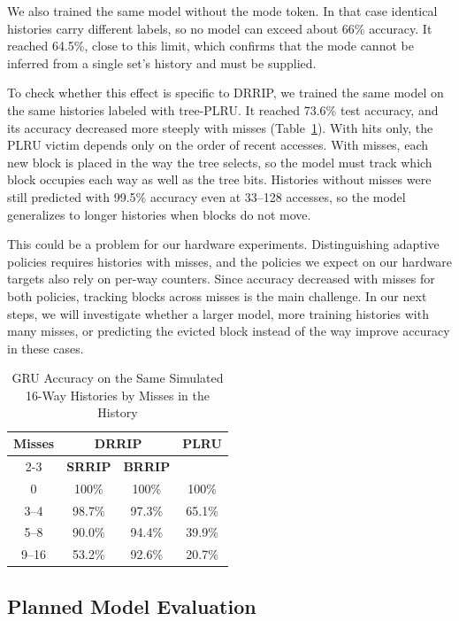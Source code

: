 We also trained the same model without the mode token. In
that case identical histories carry different labels, so
no model can exceed about 66\% accuracy. It reached
64.5\%, close to this limit, which confirms that the mode
cannot be inferred from a single set's history and must
be supplied.

To check whether this effect is specific to DRRIP, we
trained the same model on the same histories labeled with
tree-PLRU. It reached 73.6\% test accuracy, and its accuracy
decreased more steeply with misses
(Table~\ref{tab:drrip_results}). With hits only, the PLRU
victim depends only on the order of recent accesses. With
misses, each new block is placed in the way the tree
selects, so the model must track which block occupies each
way as well as the tree bits. Histories without misses were
still predicted with 99.5\% accuracy even at 33--128
accesses, so the model generalizes to longer histories when
blocks do not move.

This could be a problem for our hardware experiments.
Distinguishing adaptive policies requires histories with
misses, and the policies we expect on our hardware targets
also rely on per-way counters. Since accuracy decreased
with misses for both policies, tracking blocks across
misses is the main challenge. In our next steps, we will
investigate whether a larger model, more training histories
with many misses, or predicting the evicted block instead
of the way improve accuracy in these cases.

\begin{table}[htbp]
\centering
\caption{GRU Accuracy on the Same Simulated 16-Way Histories by Misses in the History}
\label{tab:drrip_results}
\begin{tabular}{|c|c|c|c|}
\hline
\textbf{Misses} & \multicolumn{2}{c|}{\textbf{DRRIP}} & \textbf{PLRU} \\
\cline{2-3}
 & \textbf{SRRIP} & \textbf{BRRIP} & \\
\hline
0       & 100\%   & 100\%   & 100\%   \\
3--4    & 98.7\%  & 97.3\%  & 65.1\%  \\
5--8    & 90.0\%  & 94.4\%  & 39.9\%  \\
9--16   & 53.2\%  & 92.6\%  & 20.7\%  \\
\hline
\end{tabular}
\end{table}

\subsection{Planned Model Evaluation}

